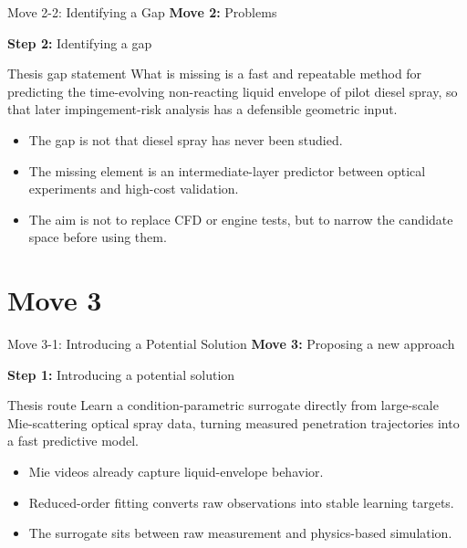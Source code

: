 \documentclass[aspectratio=169,11pt]{beamer}
\newcommand{\movetag}[2]{\textbf{Move #1:} #2}
\newcommand{\steptag}[2]{\textbf{Step #1:} #2}
\begin{document}
\begin{frame}{Move 2-2: Identifying a Gap}
\small
\movetag{2}{Problems}

\vspace{0.5em}
\steptag{2}{Identifying a gap}

\vspace{0.8em}
\begin{block}{Thesis gap statement}
What is missing is a fast and repeatable method for predicting the time-evolving non-reacting liquid envelope of pilot diesel spray, so that later impingement-risk analysis has a defensible geometric input.
\end{block}

\begin{itemize}
  \item The gap is not that diesel spray has never been studied.
  \item The missing element is an intermediate-layer predictor between optical experiments and high-cost validation.
  \item The aim is not to replace CFD or engine tests, but to narrow the candidate space before using them.
\end{itemize}
\end{frame}

\section{Move 3}

\begin{frame}{Move 3-1: Introducing a Potential Solution}
\small
\movetag{3}{Proposing a new approach}

\vspace{0.5em}
\steptag{1}{Introducing a potential solution}

\vspace{0.8em}
\begin{block}{Thesis route}
Learn a condition-parametric surrogate directly from large-scale Mie-scattering optical spray data, turning measured penetration trajectories into a fast predictive model.
\end{block}

\begin{itemize}
  \item Mie videos already capture liquid-envelope behavior.
  \item Reduced-order fitting converts raw observations into stable learning targets.
  \item The surrogate sits between raw measurement and physics-based simulation.
\end{itemize}
\end{frame}
\end{document}
